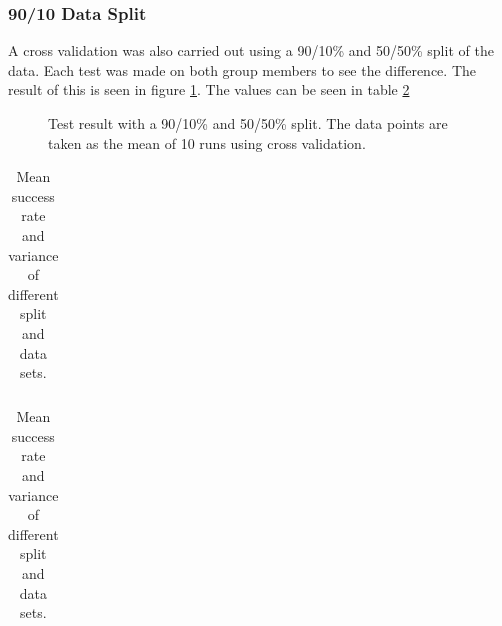 \subsubsection{90/10 Data Split}
A cross validation was also carried out using a 90/10\% and 50/50\% split of the data. 
Each test was made on both group members to see the difference.
The result of this is seen in figure \ref{fig:PersonDependent_9010}.
The values can be seen in table \ref{tb:cross}

\begin{figure}[h]
\centering
\caption[Cross validation]{Test result with a 90/10\% and 50/50\% split. The data points are taken as the mean of 10 runs using cross validation.}
\label{fig:PersonDependent_9010}
\end{figure}

\begin{table}[h]
\centering
    \begin{subtable}[b]{0.56\textwidth}
    \centering
        \begin{tabular}{lcccccc}
%             
        \end{tabular}
        \caption{Mean success rate.}
    \end{subtable}
    \begin{subtable}[b]{0.42\textwidth}
    \centering
        \begin{tabular}{lcccccc}
%             
        \end{tabular}
        \caption{Variance in success rate.}
    \end{subtable}
    \caption[Success of functions.]{Mean success rate and variance of different split and data sets.}
    \label{tb:cross}
\end{table}



